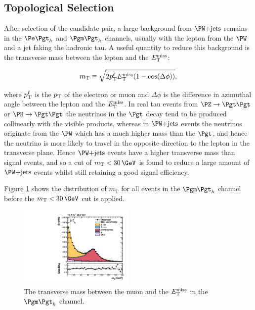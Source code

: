\subsection{Topological Selection}

After selection of the candidate pair, a large background from $\WJets$ remains
in the $\etau$ and $\mutau$ channels, usually with the lepton from the $\PW$ and
a jet faking the hadronic tau. A useful quantity to reduce this background is
the transverse mass between the lepton and the $E_{\mathrm{T}}^{\text{miss}}$:

\begin{equation}
m_{\text{T}}\equiv\sqrt{2p_{\mathrm{T}}^{\ell}E_{\mathrm{T}}^{\text{miss}}(1-\cos(\Delta\phi))},
\end{equation}

where $p_{\mathrm{T}}^{\ell}$ is the $p_{\mathrm{T}}$ of the electron or muon and $\Delta\phi$ is the
difference in azimuthal angle between the lepton and the $E_{\mathrm{T}}^{\text{miss}}$. In real tau
events from $\PZ\to\Pgt\Pgt$ or $\PH\to\Pgt\Pgt$ the neutrinos in the $\Pgt$
decay tend to be produced collinearly with the visible products, whereas in
$\WJets$ events the neutrinos originate from the $\PW$ which has a much higher
mass than the $\Pgt$, and hence the neutrino is more likely to travel in the
opposite direction to the lepton in the transverse plane. Hence $\WJets$ events
have a higher transverse mass than signal events, and so a cut of
$m_{\text{T}}<30\,\GeV$ is found to reduce a large amount of $\WJets$ events
whilst still retaining a good signal efficiency.

Figure \ref{fig:transversemass} shows the distribution of $m_{\text{T}}$ for all
events in the $\mutau$ channel before the $m_{\text{T}}<30\,\GeV$ cut is
applied.

\begin{figure}[htb]
\begin{center}
    \includegraphics[width=0.5\textwidth]
      {plots/htt-sm/mt_1_inclusive_mt_2012.pdf}

\end{center}
\caption{
 The transverse mass between the muon and the $E_{\mathrm{T}}^{\text{miss}}$ in the $\mutau$ channel.  
}
\label{fig:transversemass}
\end{figure}


